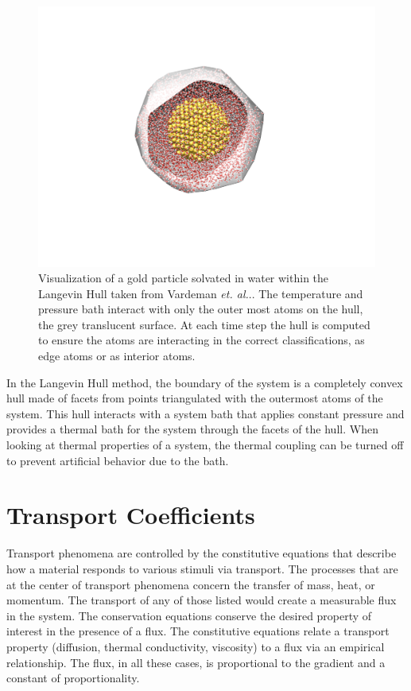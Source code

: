 \begin{figure}
    \centering
    \includegraphics[scale=1]{figures/hull.pdf}
    \caption{Visualization of a gold particle solvated in water within the Langevin Hull taken from Vardeman \textit{et. al.}.\cite{Vardeman2011}. The temperature and pressure bath interact with only the outer most atoms on the hull, the grey translucent surface. At each time step the hull is computed to ensure the atoms are interacting in the correct classifications, as edge atoms or as interior atoms.}
    \label{fig:hull}
\end{figure}

In the Langevin Hull method, the boundary of the system is a completely convex hull made of facets from points triangulated with the outermost atoms of the system. This hull interacts with a system bath that applies constant pressure and provides a thermal bath for the system through the facets of the hull. When looking at thermal properties of a system, the thermal coupling can be turned off to prevent artificial behavior due to the bath.

\section{Transport Coefficients}
Transport phenomena are controlled by the constitutive equations that describe how a material responds to various stimuli via transport.
The processes that are at the center of transport phenomena concern the transfer of mass, heat, or momentum. The transport of any of those listed would create a measurable flux in the system. The conservation equations conserve the desired property of interest in the presence of a flux.
The constitutive equations relate a transport property (diffusion, thermal conductivity, viscosity) to a flux via an empirical relationship. The flux, in all these cases, is proportional to the gradient and a constant of proportionality.

